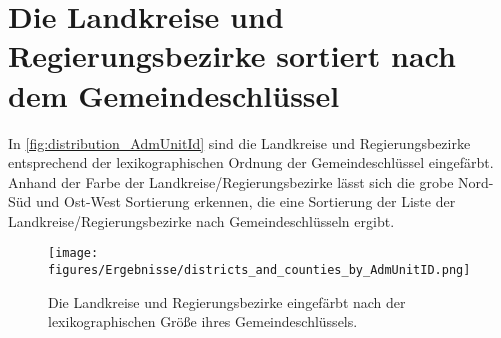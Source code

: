 \section{Die Landkreise und Regierungsbezirke sortiert nach dem Gemeindeschlüssel}
In \autoref{fig:distribution_AdmUnitId} sind die Landkreise und Regierungsbezirke entsprechend der lexikographischen Ordnung der Gemeindeschlüssel eingefärbt. Anhand der Farbe der Landkreise/Regierungsbezirke lässt sich die grobe Nord-Süd und Ost-West Sortierung erkennen, die eine Sortierung der Liste der Landkreise/Regierungsbezirke nach Gemeindeschlüsseln ergibt.
\begin{figure}[H]
    \centering
    \texttt{[image: figures/Ergebnisse/districts\_and\_counties\_by\_AdmUnitID.png]}
    \caption{Die Landkreise und Regierungsbezirke eingefärbt nach der lexikographischen Größe ihres Gemeindeschlüssels.}
    \label{fig:distribution_AdmUnitId}
\end{figure}